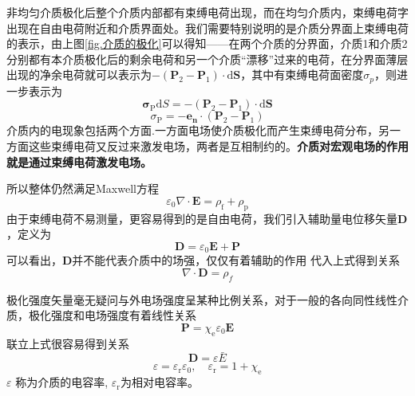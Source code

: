 		非均匀介质极化后整个介质内部都有束缚电荷出现，而在均匀介质内，束缚电荷字出现在自由电荷附近和介质界面处。我们需要特别说明的是介质分界面上束缚电荷的表示，由上图\ref{fig.介质的极化}可以得知——在两个介质的分界面，介质1和介质2分别都有本介质极化后的剩余电荷和另一个介质“漂移”过来的电荷，在分界面薄层出现的净余电荷就可以表示为$-\left(\boldsymbol{P}_{2}-\boldsymbol{P}_{1}\right) \cdot \mathrm{d} \boldsymbol{S}$，其中有束缚电荷面密度$\sigma_p$，则进一步表示为
		\begin{equation}
			\boldsymbol{\sigma}_{\mathrm{P}} \mathrm{d} S=-\left(\boldsymbol{P}_{2}-\boldsymbol{P}_{1}\right) \cdot \mathrm{d} \boldsymbol{S}
		\end{equation}
		\begin{equation}
			\sigma_{\mathrm{P}}=-\boldsymbol{e}_{\mathbf{n}} \cdot\left(\boldsymbol{P}_{2}-\boldsymbol{P}_{1}\right)
		\end{equation}
		介质内的电现象包括两个方面.一方面电场使介质极化而产生束缚电荷分布，另一方面这些束缚电荷又反过来激发电场，两者是互相制约的。\textbf{介质对宏观电场的作用就是通过束缚电荷激发电场。}

		所以整体仍然满足Maxwell方程
			\begin{equation}
				\varepsilon_{0} \nabla \cdot \boldsymbol{E}=\rho_{\mathrm{f}}+\rho_{\mathrm{p}}
				\label{eq.1.32}
			\end{equation}
		由于束缚电荷不易测量，更容易得到的是自由电荷，我们引入辅助量电位移矢量$\mathbf{D}$，定义为
		\begin{equation}
			\boldsymbol{D}=\varepsilon_{0} \boldsymbol{E}+\boldsymbol{P}
		\end{equation}
		可以看出，$\mathbf{D}$并不能代表介质中的场强，仅仅有着辅助的作用
		代入上式得到关系
		\begin{equation}
			\nabla \cdot  \boldsymbol{D}=\rho_{f}
		\end{equation}

		极化强度矢量毫无疑问与外电场强度呈某种比例关系，对于一般的各向同性线性介质，极化强度和电场强度有着线性关系
		\begin{equation}
			\boldsymbol{P}=\chi_{\mathrm{e}} \varepsilon_{0} \boldsymbol{E}
		\end{equation}
		联立上式很容易得到关系
		\begin{equation}
			\boldsymbol{D}=\varepsilon \bar{E}
		\end{equation}
		\begin{equation}
			\varepsilon=\varepsilon_{\mathrm{r}} \varepsilon_{0}, \quad \varepsilon_{\mathrm{r}}=1+\chi_{\mathrm{e}}
		\end{equation}
		$\varepsilon$ 称为介质的电容率, $\varepsilon_{\mathrm{r}}$为相对电容率。

